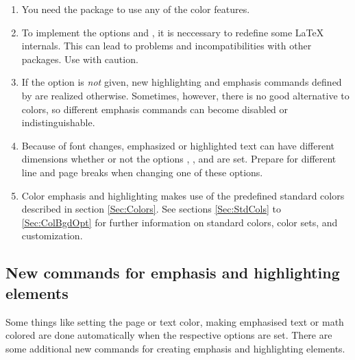 \documentclass[12pt]{scrartcl}
\let\newslide=\relax
\begin{document}
  \begin{enumerate}
  \item You need the  package to use any of the color features.

  \item To implement the options  and , it is neccessary to redefine some \LaTeX{}
    internals. This can lead to problems and incompatibilities with other packages. Use with caution.

  \item If the  option is \emph{not} given, new highlighting and emphasis commands defined by
     are realized otherwise. Sometimes, however, there is no good alternative to colors, so different
    emphasis commands can become disabled or indistinguishable.

    \newslide

  \item Because of font changes, emphasized or highlighted text can have different dimensions whether or not the options
    , , and  are set. Prepare for different line and page breaks
    when changing one of these options.

  \item Color emphasis and highlighting makes use of the predefined standard colors described in section
    \ref{Sec:Colors}. See sections \ref{Sec:StdCols} to \ref{Sec:ColBgdOpt} for further information on standard colors,
    color sets, and customization.
  \end{enumerate}

  \newslide

  \subsection{New commands for emphasis and highlighting elements}\label{Sec:Colorcommands}
  Some things like setting the page or text color, making emphasised text or math colored are done automatically when
  the respective options are set. There are some additional new commands for creating emphasis and highlighting
  elements.
\end{document}
